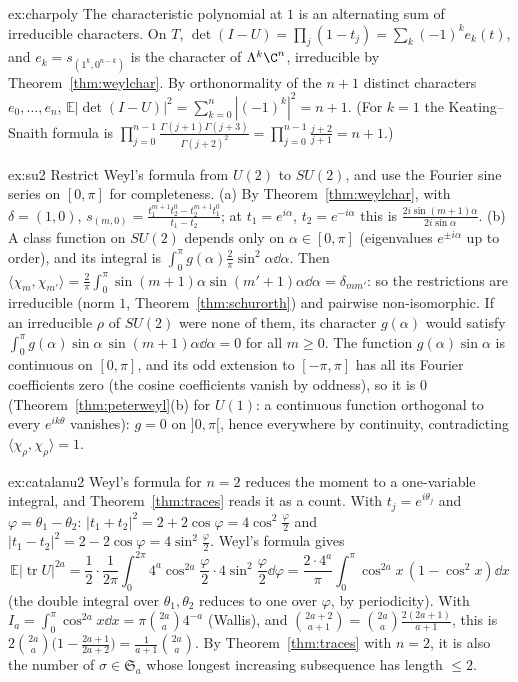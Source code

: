 \begin{solution}{ex:charpoly}
\idea The characteristic polynomial at $1$ is an alternating sum of irreducible characters.
\writeup On $T$, $\det(I-U)=\prod_j(1-t_j)=\sum_k(-1)^ke_k(t)$, and $e_k=s_{(1^k,0^{n-k})}$ is the character of $\Lambda^k\C^n$, irreducible by Theorem~\ref{thm:weylchar}. By orthonormality of the $n+1$ distinct characters $e_0,\dots,e_n$,
$\mathbb E|\det(I-U)|^2=\sum_{k=0}^n|(-1)^k|^2=n+1$. (For $k=1$ the Keating--Snaith formula is $\prod_{j=0}^{n-1}\frac{\Gamma(j+1)\Gamma(j+3)}{\Gamma(j+2)^2}=\prod_{j=0}^{n-1}\frac{j+2}{j+1}=n+1$.)
\end{solution}

\begin{solution}{ex:su2}
\idea Restrict Weyl's formula from $U(2)$ to $SU(2)$, and use the Fourier sine series on $[0,\pi]$ for completeness.
\writeup (a) By Theorem~\ref{thm:weylchar}, with $\delta=(1,0)$, $s_{(m,0)}=\frac{t_1^{m+1}t_2^0-t_2^{m+1}t_1^0}{t_1-t_2}$; at $t_1=e^{i\alpha}$, $t_2=e^{-i\alpha}$ this is $\frac{2i\sin(m+1)\alpha}{2i\sin\alpha}$.
(b) A class function on $SU(2)$ depends only on $\alpha\in[0,\pi]$ (eigenvalues $e^{\pm i\alpha}$ up to order), and its integral is $\int_0^\pi g(\alpha)\frac2\pi\sin^2\alpha\dd\alpha$. Then $\langle\chi_m,\chi_{m'}\rangle=\frac2\pi\int_0^\pi\sin(m+1)\alpha\sin(m'+1)\alpha\dd\alpha=\delta_{mm'}$:
so the restrictions are irreducible (norm $1$, Theorem~\ref{thm:schurorth}) and pairwise non-isomorphic. If an irreducible $\rho$ of $SU(2)$ were none of them, its character $g(\alpha)$ would satisfy $\int_0^\pi g(\alpha)\sin\alpha\,\sin(m+1)\alpha\dd\alpha=0$ for all $m\ge0$. The function
$g(\alpha)\sin\alpha$ is continuous on $[0,\pi]$, and its odd extension to $[-\pi,\pi]$ has all its Fourier coefficients zero (the cosine coefficients vanish by oddness), so it is $0$ (Theorem~\ref{thm:peterweyl}(b) for $U(1)$: a continuous function orthogonal to every $e^{ik\theta}$ vanishes): $g=0$ on $]0,\pi[$, hence everywhere by continuity, contradicting $\langle\chi_\rho,\chi_\rho\rangle=1$.
\end{solution}

\begin{solution}{ex:catalanu2}
\idea Weyl's formula for $n=2$ reduces the moment to a one-variable integral, and Theorem~\ref{thm:traces} reads it as a count.
\writeup With $t_j=e^{i\theta_j}$ and $\varphi=\theta_1-\theta_2$: $|t_1+t_2|^2=2+2\cos\varphi=4\cos^2\frac\varphi2$ and $|t_1-t_2|^2=2-2\cos\varphi=4\sin^2\frac\varphi2$. Weyl's formula gives
\[
\mathbb E|\operatorname{tr}U|^{2a}=\frac12\cdot\frac1{2\pi}\int_0^{2\pi}4^a\cos^{2a}\frac\varphi2\cdot4\sin^2\frac\varphi2\dd\varphi=\frac{2\cdot4^a}\pi\int_0^\pi\cos^{2a}x\,(1-\cos^2x)\dd x
\]
(the double integral over $\theta_1,\theta_2$ reduces to one over $\varphi$, by periodicity). With $I_a=\int_0^\pi\cos^{2a}x\dd x=\pi\binom{2a}a4^{-a}$ (Wallis), and $\binom{2a+2}{a+1}=\binom{2a}a\frac{2(2a+1)}{a+1}$, this is
$2\binom{2a}a\bigl(1-\frac{2a+1}{2a+2}\bigr)=\frac1{a+1}\binom{2a}a$. By Theorem~\ref{thm:traces} with $n=2$, it is also the number of $\sigma\in\mathfrak S_a$ whose longest increasing subsequence has length $\le2$.
\end{solution}

